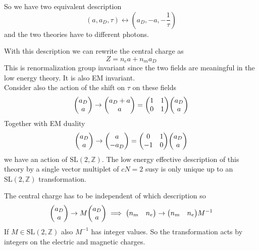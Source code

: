 \documentclass[11pt]{article}
\theoremstyle{definition}
\numberwithin{equation}{section}
\newcommand*\bbZ{\mathbb{Z}}
\newcommand*\SL{\mathrm{SL}}
\begin{document}
So we have two equivalent description 
\begin{equation}
	(a,a_{D},\tau)\leftrightarrow (a_{D},-a,-\frac{1}{\tau})
\end{equation}
and the two theories have to different photons.

With this description we can rewrite the central charge as
\begin{equation}
	Z=n_{e}a+n_{m}a_{D}
\end{equation}
This is renormalization group invariant since the two fields are meaningful in the low energy theory. It is also EM invariant.\\
Consider also the action of the shift on $\tau$ on these fields
\begin{equation}
	\mqty(a_{D}\\a)\rightarrow \mqty(a_{D}+a\\a)=\mqty(1&1\\0&1)\mqty(a_{D}\\a)
\end{equation}
Together with EM duality
\begin{equation}
	\mqty(a_{D}\\a)\rightarrow \mqty(a\\-a_{D})=\mqty(0&1\\-1&0)\mqty(a_{D}\\a)
\end{equation}
we have an action of $\SL(2,\bbZ)$. The low energy effective description of this theory by a single vector multiplet of $cN=2$ susy is only unique up to an $\SL(2,\bbZ)$ transformation.

The central charge has to be independent of which description so
\begin{equation}
	\mqty(a_{D}\\a)\rightarrow M\mqty(a_{D}\\a)\implies \mqty(n_{m}&n_{e})\rightarrow \mqty(n_{m}&n_{e})M^{-1}
\end{equation}
If $M\in\SL(2,\bbZ)$ also $M^{-1}$ has integer values. So the transformation acts by integers on the electric and magnetic charges.
\end{document}
